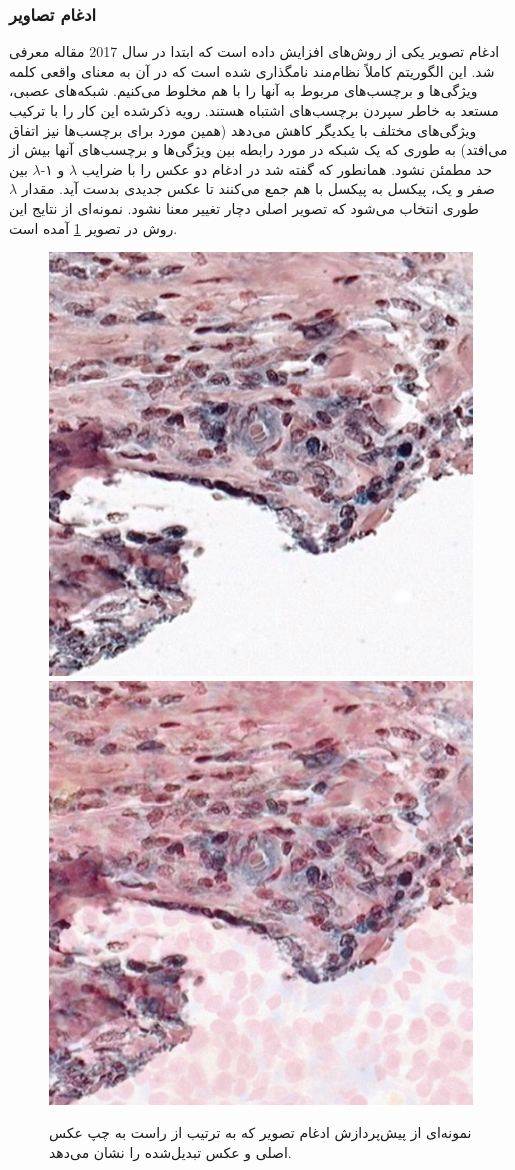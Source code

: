 \subsubsection{ادغام تصاویر}
ادغام تصویر یکی از روش‌های افزایش داده است که ابتدا در سال 2017 مقاله
\cite{zhang2017mixup}
معرفی شد.
این الگوریتم کاملاً نظام‌مند نامگذاری شده است که در آن به معنای واقعی کلمه ویژگی‌ها و برچسب‌های مربوط به آنها را با هم مخلوط می‌کنیم. شبکه‌های عصبی، مستعد به خاطر سپردن برچسب‌های اشتباه هستند. رویه ذکر‌شده این کار را با ترکیب ویژگی‌های مختلف با یکدیگر کاهش می‌دهد (همین مورد برای برچسب‌ها نیز اتفاق می‌افتد) به طوری که یک شبکه در مورد رابطه بین ویژگی‌ها و برچسب‌های آنها بیش از حد مطمئن نشود.
همانطور که گفته شد در ادغام دو عکس را با ضرایب $\lambda$ و ۱-$\lambda$ بین صفر و یک، پیکسل به پیکسل با هم جمع می‌کنند تا عکس جدیدی بدست آید. مقدار $\lambda$ طوری انتخاب می‌شود که تصویر اصلی دچار تغییر معنا نشود.
نمونه‌ای از نتایج این روش در تصویر \ref{mixup augmentation} آمده است.
\begin{figure}
    \begin{center}
        \includegraphics[width=0.48\linewidth]{figs/suggested_methods/subs/data_augmentation/mixup_776-original.jpeg}
        \includegraphics[width=0.48\linewidth]{figs/suggested_methods/subs/data_augmentation/mixup_776-transformed.jpeg}
    \end{center}
    \caption{نمونه‌ای از پیش‌پردازش ادغام تصویر که به ترتیب از راست به چپ عکس اصلی و عکس تبدیل‌شده را نشان می‌دهد.}
    \label{mixup augmentation}
\end{figure}
